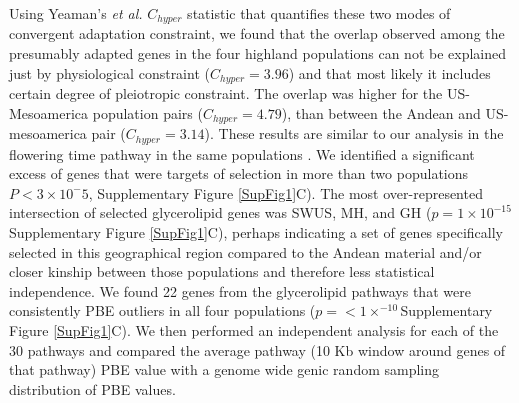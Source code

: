 \documentclass[9pt,twocolumn,twoside,lineno]{BioRxiv}
\begin{document}
Using Yeaman's \textit{et al.} $C_{hyper}$ statistic \cite{yeaman2018} that quantifies these two modes of convergent adaptation constraint, we found that the overlap observed among the presumably adapted genes in the four highland populations can not be explained just by physiological constraint ($C_{hyper} = 3.96$) and that most likely it includes certain degree of pleiotropic constraint.
The overlap was higher for the US-Mesoamerica population pairs ($C_{hyper} = 4.79$), than between the Andean and US-mesoamerica pair ($C_{hyper} = 3.14$).
These results are similar to our analysis in the flowering time pathway in the same populations \cite{Wang2020-mp}.
We identified a significant excess of genes that were targets of selection in more than two populations $P< 3 \times 10^-5$, Supplementary Figure \ref{SupFig1}C).
The most over-represented intersection of selected glycerolipid genes was SWUS, MH, and GH ($p = 1  \times 10 ^{-15} $Supplementary Figure \ref{SupFig1}C), perhaps indicating a set of genes specifically selected in this geographical region compared to the Andean material and/or closer kinship between those populations and therefore less statistical independence.
We found 22 genes from the glycerolipid pathways that were consistently PBE outliers in all four populations ($p =<1  \times  ^{-10}$Supplementary Figure \ref{SupFig1}C). 
We then performed an independent analysis for each of the 30 pathways and compared the average pathway (10 Kb window around genes of that pathway) PBE value with a genome wide genic random sampling distribution of PBE values. 
\end{document}

